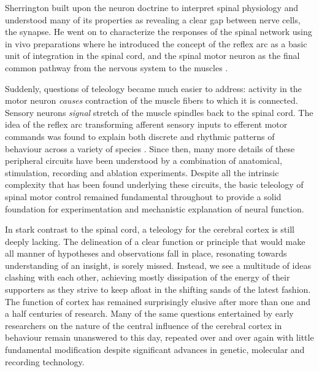 Sherrington built upon the neuron doctrine to interpret spinal physiology and understood many of its properties as revealing a clear gap between nerve cells, the synapse. He went on to characterize the responses of the spinal network using in vivo preparations where he introduced the concept of the reflex arc as a basic unit of integration in the spinal cord, and the spinal motor neuron as the final common pathway from the nervous system to the muscles \cite{Sherrington1906}.

Suddenly, questions of teleology became much easier to address: activity in the motor neuron \emph{causes} contraction of the muscle fibers to which it is connected. Sensory neurons \emph{signal} stretch of the muscle spindles back to the spinal cord. The idea of the reflex arc transforming afferent sensory inputs to efferent motor commands was found to explain both discrete and rhythmic patterns of behaviour across a variety of species \cite{Sherrington1893b}. Since then, many more details of these peripheral circuits have been understood by a combination of anatomical, stimulation, recording and ablation experiments. Despite all the intrinsic complexity that has been found underlying these circuits, the basic teleology of spinal motor control remained fundamental throughout to provide a solid foundation for experimentation and mechanistic explanation of neural function.

In stark contrast to the spinal cord, a teleology for the cerebral cortex is still deeply lacking. The delineation of a clear function or principle that would make all manner of hypotheses and observations fall in place, resonating towards understanding of an insight, is sorely missed. Instead, we see a multitude of ideas clashing with each other, achieving mostly dissipation of the energy of their supporters as they strive to keep afloat in the shifting sands of the latest fashion. The function of cortex has remained surprisingly elusive after more than one and a half centuries of research. Many of the same questions entertained by early researchers on the nature of the central influence of the cerebral cortex in behaviour remain unanswered to this day, repeated over and over again with little fundamental modification despite significant advances in genetic, molecular and recording technology.
